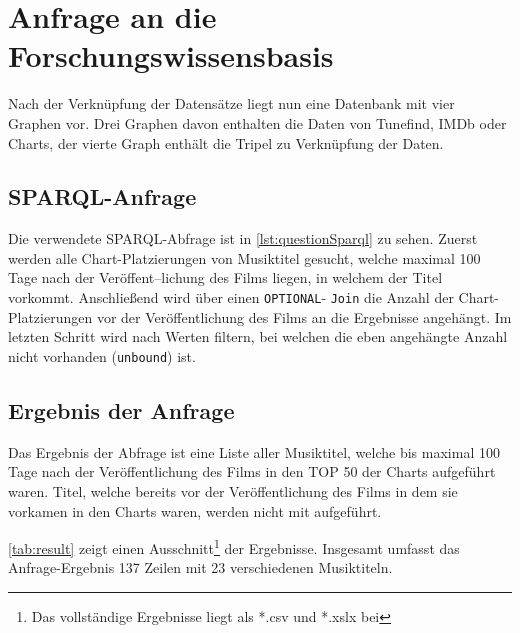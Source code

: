 \documentclass[parskip]{scrartcl}
\begin{document}
\section{Anfrage an die Forschungswissensbasis}

Nach der Verknüpfung der Datensätze liegt nun eine Datenbank mit vier Graphen vor. Drei Graphen davon enthalten die Daten von Tunefind, IMDb oder Charts, der vierte Graph enthält die Tripel zu Verknüpfung der Daten.

\subsection{SPARQL-Anfrage}

Die verwendete SPARQL-Abfrage ist in \autoref{lst:questionSparql} zu sehen. Zuerst werden alle Chart-Platzierungen von Musiktitel gesucht, welche maximal 100 Tage nach der Veröffent--lichung des Films liegen, in welchem der Titel vorkommt. Anschließend wird über einen \texttt{OPTIONAL}- \texttt{Join} die Anzahl der Chart-Platzierungen vor der Veröffentlichung des Films an die Ergebnisse angehängt. Im letzten Schritt wird nach Werten filtern, bei welchen die eben angehängte Anzahl nicht vorhanden (\texttt{unbound}) ist.

\subsection{Ergebnis der Anfrage} 

Das Ergebnis der Abfrage ist eine Liste aller Musiktitel, welche bis maximal 100 Tage nach der Veröffentlichung des Films in den TOP 50 der Charts aufgeführt waren. Titel, welche bereits vor der Veröffentlichung des Films in dem sie vorkamen in den Charts waren, werden nicht mit aufgeführt.

\autoref{tab:result} zeigt einen Ausschnitt\footnote{Das vollständige Ergebnisse liegt als *.csv und *.xslx bei} der Ergebnisse. Insgesamt umfasst das Anfrage-Ergebnis 137 Zeilen mit 23 verschiedenen Musiktiteln.
\end{document}
